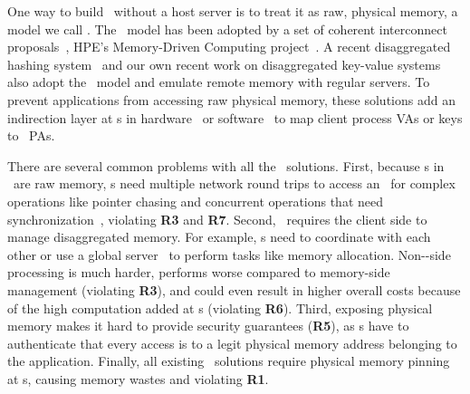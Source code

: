 One way to build \md\ without a host server is to treat it as raw, physical memory,
a model we call {\em \pdm}.
The \pdm\ model has been adopted by a set of coherent interconnect proposals~\cite{Genz-citation,CXL-citation},
HPE's Memory-Driven Computing project~\cite{HP-TheMachine,THEMACHINE-HOTOS,HP-MODC-POSTER,THEMACHINE-WEB}.
A recent disaggregated hashing system~\cite{race-atc21} and our own recent work on disaggregated key-value systems~\cite{Tsai20-ATC} also adopt the \pdm\ model and emulate remote memory with regular servers.
To prevent applications from accessing raw physical memory,
these solutions add an indirection layer at \CN{}s in hardware~\cite{Genz-citation,CXL-citation} or software~\cite{Tsai20-ATC,race-atc21}
to map client process VAs or keys
to \MN\ PAs. 

There are several common problems with all the \pdm\ solutions.
First, because \MN{}s in \pdm\ are raw memory, \CN{}s need multiple network round trips to access an \MN\ 
for complex operations like pointer chasing and concurrent operations that need synchronization~\cite{Tsai20-ATC}, violating \textbf{R3} and \textbf{R7}.
Second, \pdm\ requires the client side to manage disaggregated memory.
For example, \CN{}s need to coordinate with each other or use a global server~\cite{Tsai20-ATC} to perform tasks like memory allocation.
Non-\MN-side processing is much harder, performs worse compared to memory-side management (violating \textbf{R3}), and could even result in higher overall costs because of the high computation added at \CN{}s (violating \textbf{R6}).
Third, exposing physical memory makes it hard to provide security guarantees (\textbf{R5}),
as \MN{}s have to authenticate that every access is to a legit physical memory address belonging to the application.
Finally, all existing \pdm\ solutions require physical memory pinning at \MN{}s, causing memory wastes and violating \textbf{R1}.

